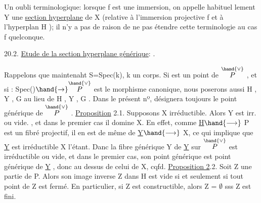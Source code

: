 
Un oubli terminologique: lorsque f est une immersion, on appelle habituel%
lement Y\hand{$_\xi$} une \uline{section hyperplane} de X (relative à l'immersion projective
f et à l'hyperplan H  ); il n'y a pas de raison de ne pas étendre cette
terminologie au cas f quelconque.

20.2. \uline{Etude de la section hyperplane générique}:  .

Rappelons que maintenaht S=Spec(k), k un corps. Si \hand{$\eta$} est un point
de $\overset{\hand{\vee}}{P}$ ,  et si \hand{$\xi$}: Spec(\hand{$\eta$})$\hand{\to}\overset{\hand{\vee}}{P}$ est le morphisme canonique, nous poserons
aussi H\hand{$_\eta$} , Y\hand{$_\eta$} , G\hand{$_\eta$} au lieu de H\hand{$_\xi$} , Y\hand{$_\xi$} , G\hand{$_\xi$} . Dans le présent nº, \hand{$\eta$}
désignera toujours le point générique de $\overset{\hand{\vee}}{P}$ .
\uline{Proposition} 2.1. Supposons X irréductible. Alors Y\hand{$_\eta$} est irr.  ou vide. ,
et dans le premier cas il domine X. 
En effet, comme \uline{H}$\hand{\longrightarrow}$ P est un fibré projectif, il en est de même de
\uline{Y}$\hand{\longrightarrow}$ X, ce qui implique que \uline{Y} est irréductible X l'étant. Danc la fibre
générique Y   de \uline{Y} sur $\overset{\hand{\vee}}{P}$ est irréductible ou vide, et dans le premier cas,
son point générique est point générique de \uline{Y} , donc au dessus de celui de
X, cqfd.
\uline{Proposition 2}.2. Soit Z une partie de P. Alors son image inverse Z\hand{$_\eta$} dans
H\hand{$_\eta$} est vide si et seulement si tout point de Z est fermé. En particulier,
si Z est constructible, alors Z\hand{$_\eta$} = $\emptyset$ sss Z est fini.

